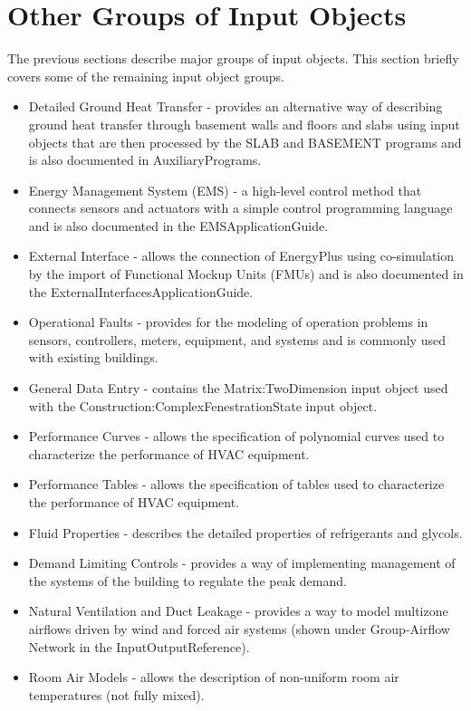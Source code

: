 \section{Other Groups of Input Objects}

The previous sections describe major groups of input objects. This
section briefly covers some of the remaining input object groups.
\begin{itemize}
\item Detailed Ground Heat Transfer - provides an alternative way of describing
ground heat transfer through basement walls and floors and slabs using
input objects that are then processed by the SLAB and BASEMENT programs
and is also documented in AuxiliaryPrograms.
\item Energy Management System (EMS) - a high-level control method that
connects sensors and actuators with a simple control programming language
and is also documented in the EMSApplicationGuide.
\item External Interface - allows the connection of EnergyPlus using co-simulation
by the import of Functional Mockup Units (FMUs) and is also documented
in the ExternalInterfacesApplicationGuide.
\item Operational Faults - provides for the modeling of operation problems
in sensors, controllers, meters, equipment, and systems and is commonly
used with existing buildings.
\item General Data Entry - contains the Matrix:TwoDimension input object
used with the Construction:ComplexFenestrationState input object.
\item Performance Curves - allows the specification of polynomial curves
used to characterize the performance of HVAC equipment.
\item Performance Tables - allows the specification of tables used to characterize
the performance of HVAC equipment.
\item Fluid Properties - describes the detailed properties of refrigerants
and glycols.
\item Demand Limiting Controls - provides a way of implementing management
of the systems of the building to regulate the peak demand.
\item Natural Ventilation and Duct Leakage - provides a way to model multizone
airflows driven by wind and forced air systems (shown under Group-Airflow
Network in the InputOutputReference).
\item Room Air Models - allows the description of non-uniform room air temperatures
(not fully mixed).

\end{itemize}
